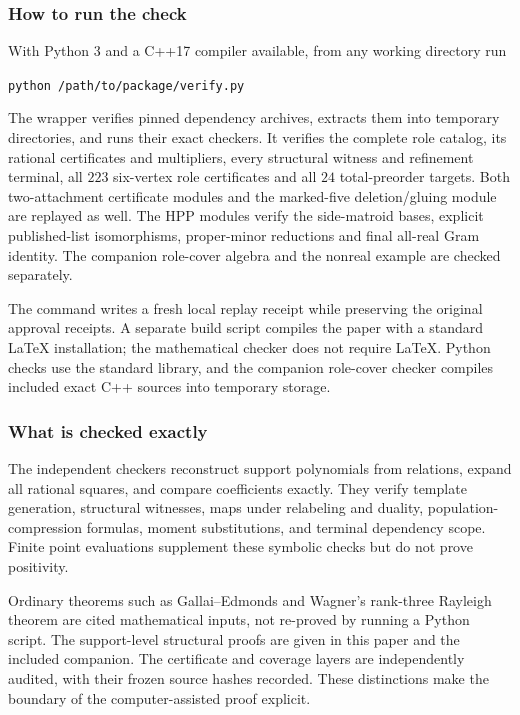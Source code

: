 \documentclass[11pt]{article}
\numberwithin{equation}{section}
\theoremstyle{definition}\newtheorem{definition}[theorem]{Definition}\newtheorem{remark}[theorem]{Remark}
\begin{document}
\subsubsection{How to run the check}
With Python 3 and a C++17 compiler available, from any working directory run
\begin{center}\texttt{python /path/to/package/verify.py}\end{center}
The wrapper verifies pinned dependency archives, extracts them into temporary directories, and runs their exact checkers. It verifies the complete role catalog, its rational certificates and multipliers, every structural witness and refinement terminal, all $223$ six-vertex role certificates and all $24$ total-preorder targets. Both two-attachment certificate modules and the marked-five deletion/gluing module are replayed as well. The HPP modules verify the side-matroid bases, explicit published-list isomorphisms, proper-minor reductions and final all-real Gram identity. The companion role-cover algebra and the nonreal example are checked separately.

The command writes a fresh local replay receipt while preserving the original approval receipts. A separate build script compiles the paper with a standard LaTeX installation; the mathematical checker does not require LaTeX. Python checks use the standard library, and the companion role-cover checker compiles included exact C++ sources into temporary storage.

\subsubsection{What is checked exactly}
The independent checkers reconstruct support polynomials from relations, expand all rational squares, and compare coefficients exactly. They verify template generation, structural witnesses, maps under relabeling and duality, population-compression formulas, moment substitutions, and terminal dependency scope. Finite point evaluations supplement these symbolic checks but do not prove positivity.

Ordinary theorems such as Gallai--Edmonds and Wagner's rank-three Rayleigh theorem are cited mathematical inputs, not re-proved by running a Python script. The support-level structural proofs are given in this paper and the included companion. The certificate and coverage layers are independently audited, with their frozen source hashes recorded. These distinctions make the boundary of the computer-assisted proof explicit.
\end{document}
